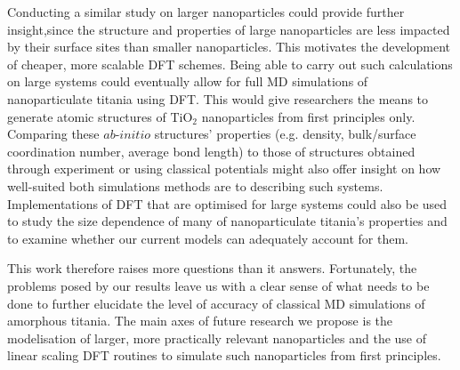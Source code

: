 \documentclass[aps,prb,twocolumn,amsmath,amssymb,superscriptaddress,longbibliography]{revtex4-1}
\newcommand\tab[1][1cm]{\hspace*{#1}} %
\begin{document}

\tab Conducting a similar study on larger nanoparticles could provide further insight,since
the structure and properties of large nanoparticles are less impacted by their surface sites than smaller nanoparticles\cite{realistic_nnp}.
This motivates the development of cheaper, more scalable DFT schemes.  
Being able to carry out such calculations on large systems could eventually allow for full MD simulations of nanoparticulate titania using DFT.
This would give researchers the means to generate atomic structures of $\text{TiO}_2$ nanoparticles from first principles only. 
Comparing these $\textit{ab-initio}$ structures' properties (e.g. density, bulk/surface coordination number, average bond length) to those of structures obtained through experiment or using classical potentials might also offer insight on how well-suited both simulations methods are to describing such systems.
Implementations of DFT that are optimised for large systems could also be used to study the size dependence of many of nanoparticulate titania's properties and to examine whether our current models can adequately account for them. 

\tab This work therefore raises more questions than it answers.
Fortunately, the problems posed by our results leave us with a clear sense of what needs to be done to further elucidate the level of accuracy of classical MD simulations of amorphous titania.
The main axes of future research we propose is the modelisation of larger, more practically relevant nanoparticles and the use of linear scaling DFT routines to simulate such nanoparticles from first principles.
\end{document}
